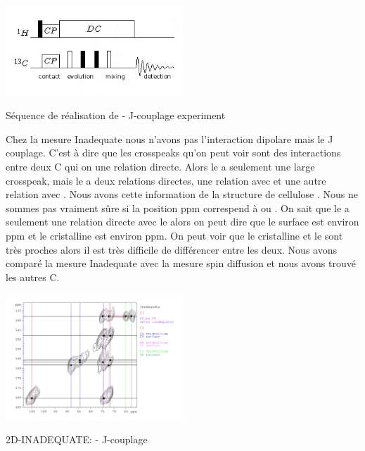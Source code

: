 \documentclass[a4paper,12pt]{scrartcl}
\begin{document}
{\begin{figurehere}
    \center
     \includegraphics[width=0.5\textwidth]{bilder/PDSD4.png}
     \caption{Séquence de réalisation de  -  J-couplage experiment}
    \end{figurehere}
Chez la mesure Inadequate nous n’avons pas l’interaction dipolare mais le J couplage. C’est à dire que les crosspeaks qu’on peut voir sont des interactions entre deux C qui on une relation directe. Alors le  a seulement une large crosspeak, mais le  a deux relations directes, une relation avec  et une autre relation avec . Nous avons cette information de la structure de cellulose \cite{dokument}. Nous ne sommes pas vraiment sûre si la position \unit [74,5] {ppm} correspend à  ou . On sait que le  a seulement une relation directe avec le  alors on peut dire que le  surface est environ \unit [72,1] {ppm} et le  cristalline est environ \unit [74,9] {ppm}. On peut voir que le  cristalline et le  sont très proches alors il est très difficile de différencer entre les deux. Nous avons comparé la mesure Inadequate avec la mesure spin diffusion et nous avons trouvé les autres C. 
\begin{figurehere}
    \center
    \includegraphics[width=0.5\textwidth]{bilder/inad.png}
    \caption{2D-INADEQUATE:  -  J-couplage }
   \end{figurehere}
}
\end{document}
